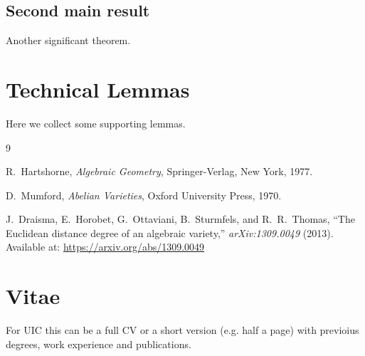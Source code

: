 \documentclass[12pt,reqno,oneside]{amsbook}
\theoremstyle{definition}
\begin{document}
\section{Second main result}
Another significant theorem.


\appendix
\chapter{Technical Lemmas}
Here we collect some supporting lemmas.

\backmatter 
\singlespacing

\begin{thebibliography}{9}


R.~Hartshorne, \emph{Algebraic Geometry}, Springer-Verlag, New York, 1977.

D.~Mumford, \emph{Abelian Varieties}, Oxford University Press, 1970.

J.~Draisma, E.~Horobet, G.~Ottaviani, B.~Sturmfels, and R.~R.~Thomas, 
``The Euclidean distance degree of an algebraic variety,'' 
\emph{arXiv:1309.0049} (2013).  
Available at: \href{https://arxiv.org/abs/1309.0049}{https://arxiv.org/abs/1309.0049}

\end{thebibliography}


\chapter*{Vitae}

For UIC this can be a full CV or a short version (e.g. half a page) with previoius degrees, work experience and publications.
\end{document}

